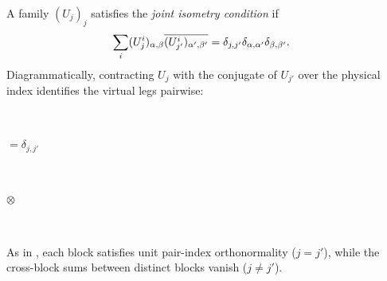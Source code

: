 \begin{definition}%
    \label{def:is_residual_isometry_family}
    \leanok
    A family $(U_j)_j$ satisfies the \emph{joint isometry condition} if
    \begin{align}
        \sum_i(U_j^i)_{\alpha,\beta}
        \overline{(U_{j'}^i)_{\alpha',\beta'}}
         & =\delta_{j,j'}\delta_{\alpha,\alpha'}\delta_{\beta,\beta'}.
        \notag
    \end{align}
    Diagrammatically, contracting $U_j$ with the conjugate of $U_{j'}$ over
    the physical index identifies the virtual legs pairwise:
    \begin{tenkzequation}
        \tenkzkernel
        \begin{tenkz}[rows={ket,bra}, cols=1, west=open, east=open]
             \\
        \end{tenkz}
        $ = \delta_{j,j'}\,$
        \begin{tenkz}[rows={wire,wire}, cols=1, west=open, east=cup,
                bonds=none]
            \tn[skin=none]{} \\ \tn[skin=none]{}
        \end{tenkz}
        $ \otimes $
        \begin{tenkz}[rows={wire,wire}, cols=1, west=cup, east=open,
                bonds=none]
            \tn[skin=none]{} \\ \tn[skin=none]{}
        \end{tenkz}
    \end{tenkzequation}
    As in \cite[Theorem~3.11]{Cirac2016MPDO_arXiv}, each block satisfies unit
    pair-index orthonormality ($j=j'$), while the cross-block sums between
    distinct blocks vanish ($j\ne j'$).
\end{definition}

